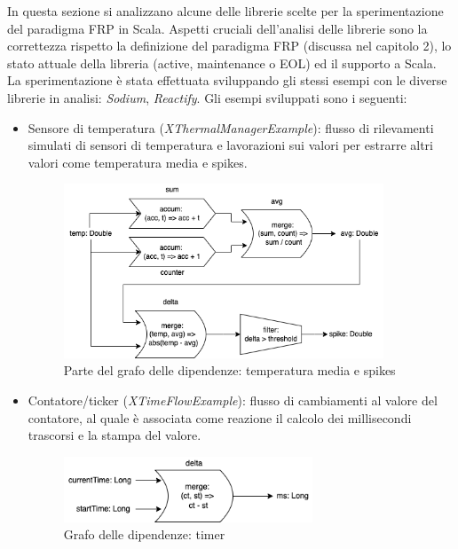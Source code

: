 \documentclass[../main.tex]{subfiles}
\begin{document}
In questa sezione si analizzano alcune delle librerie scelte per la sperimentazione del paradigma FRP in Scala. Aspetti cruciali dell'analisi delle librerie sono la correttezza rispetto la definizione del paradigma FRP (discussa nel capitolo 2), lo stato attuale della libreria (active, maintenance o EOL) ed il supporto a Scala. La sperimentazione è stata effettuata sviluppando gli stessi esempi con le diverse librerie in analisi: \textit{Sodium}, \textit{Reactify}. Gli esempi sviluppati sono i seguenti:
\begin{itemize}
    \item Sensore di temperatura (\textit{XThermalManagerExample}): flusso di rilevamenti simulati di sensori di temperatura e lavorazioni sui valori per estrarre altri valori come temperatura media e spikes.
    \begin{figure}[H]
        \centering
        \includegraphics[width=0.9\textwidth]{img/frp-scala-Page-3.drawio.png}
        \caption{Parte del grafo delle dipendenze: temperatura media e spikes}
    \end{figure}
    \item Contatore/ticker (\textit{XTimeFlowExample}): flusso di cambiamenti al valore del contatore, al quale è associata come reazione il calcolo dei millisecondi trascorsi e la stampa del valore.
    \begin{figure}[H]
        \centering
        \includegraphics[width=0.7\textwidth]{img/frp-scala-Page-4.drawio.png}
        \caption{Grafo delle dipendenze: timer}
    \end{figure}
\end{itemize}
\end{document}
